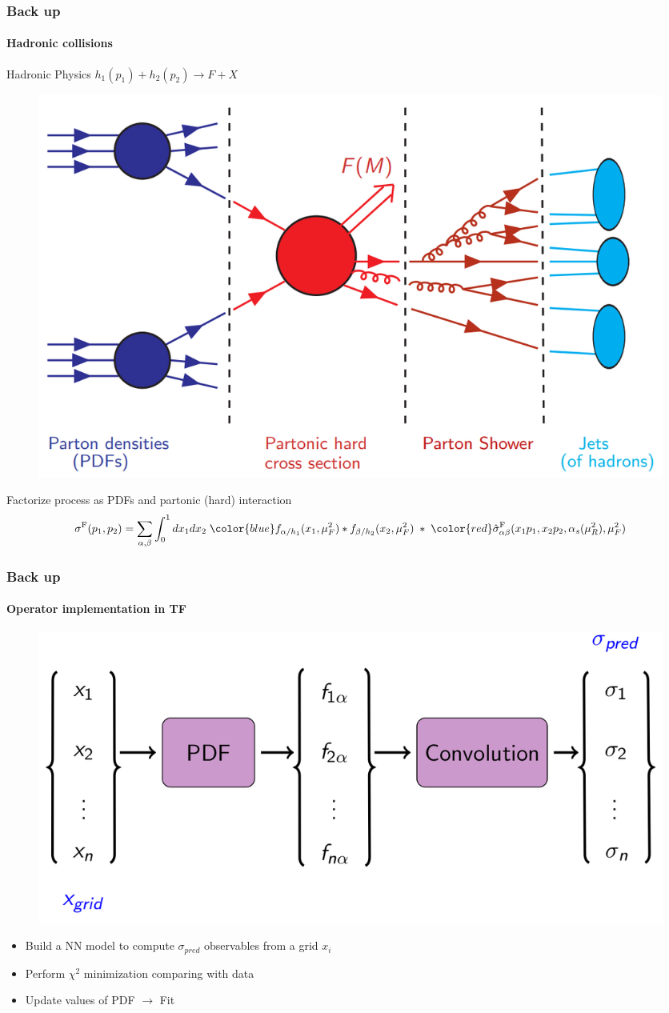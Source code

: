 \documentclass[aspectratio=43]{beamer}
\begin{document}
\begin{frame}
	
	\frametitle{Back up}
	\framesubtitle{Hadronic collisions}
	
	\center \textrm{Hadronic Physics} \footnotesize $h_{1}(p_{1}) + h_{2}(p_{2}) \rightarrow F + X$ 
	
	\begin{figure}
		\includegraphics[width = 7 cm]{plots/section1/factorization_1.png}
	\end{figure}
	
	\center \footnotesize {Factorize process as {\color{blue}PDFs} and {\color{red} partonic (hard) interaction}	
	\begin{equation}
		\sigma^{\textrm{F}}(p_{1}, p_{2}) = \sum_{\alpha, \beta}
		\int_{0}^{1} dx_{1} dx_{2} \; {\color{blue} f_{\alpha/h_{1}}(x_{1}, \mu_{F}^{2}) \ast f_{\beta/h_{2}}(x_{2}, \mu_{F}^{2})}
		\; \ast \;  
		{\color{red}\hat{\sigma}^{\textrm{F}}_{\alpha \beta}(x_{1}p_{1}, x_{2}p_{2}, \alpha_{s}(\mu_{R}^{2}), \mu_{F}^{2})} \nonumber
	\end{equation}}

\end{frame}

\begin{frame}

\frametitle{Back up}
\framesubtitle{Operator implementation in TF}

\begin{figure}
	\includegraphics[width = 8.5 cm]{plots/section2/TF_convolution.png}
\end{figure}


\begin{itemize}
	\item \footnotesize Build a NN model to compute $\sigma_{pred}$ observables from a grid $x_{i}$
	\item \footnotesize Perform $\chi^{2}$ minimization comparing with data
	\item \footnotesize Update values of PDF $\longrightarrow$ {\color{violet} Fit}
\end{itemize}

\end{frame}
\end{document}
